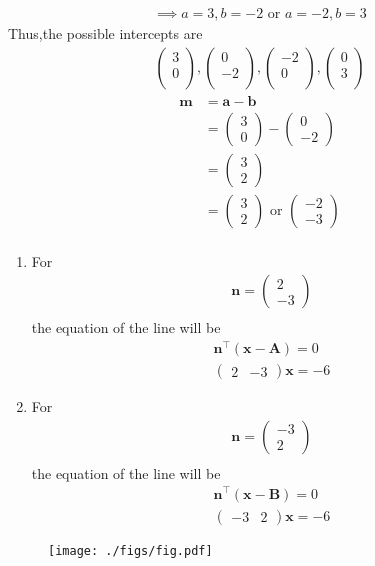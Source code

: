 \documentclass[10pt]{article}
\providecommand{\brak}[1]{\ensuremath{\left(#1\right)}}
\newcommand{\myvec}[1]{\ensuremath{\begin{pmatrix}#1\end{pmatrix}}}
\let\vec\mathbf
\begin{document}
\begin{align}
\implies a=3,b=-2 \text{ or }   a=-2,b=3
\end{align}
Thus,the possible intercepts are\\
\begin{align}
\myvec{3\\ 0 \\} ,\myvec{0\\ -2 \\} ,\myvec{-2\\ 0 \\}, \myvec{0\\ 3 \\}
\end{align}
\begin{align}
\vec{m}&=\vec{a}-\vec{b}\\
&=\myvec{3\\0}-\myvec{0\\-2}\\
&=\myvec{3\\2}\\
&=\myvec{3\\2} \text{ or } \myvec{-2\\-3}\\
\end{align}
\begin{enumerate}
\item For
\begin{align}
\vec{n} = \myvec{ 2\\-3}\\
\end{align}
the equation of the line will be\\
\begin{align}
\vec{n}^{\top}\brak{\vec{x}-\vec{A}}=0\\
\myvec{2&-3}\vec{x}=-6
\end{align}
\item For
\begin{align}
\vec{n}=\myvec{-3\\2}\\
\end{align}
the equation of the line will be\\
\begin{align}
\vec{n}^{\top}\brak{\vec{x}-\vec{B}}=0\\
\myvec{-3&2}\vec{x}=-6
\end{align}
\end{enumerate}
\begin{figure}[!h]
	\begin{center}
		\texttt{[image: ./figs/fig.pdf]}
	\end{center}
\caption{}
\label{figure}
\end{figure}
\end{document}
